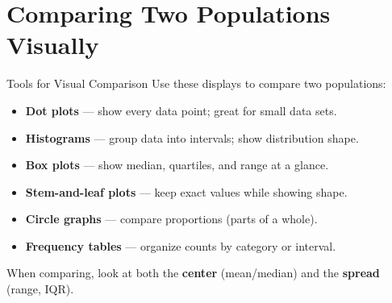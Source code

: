 \section{Comparing Two Populations Visually}

\begin{quickReview}{Tools for Visual Comparison}
Use these displays to compare two populations:

\begin{itemize}[leftmargin=*]
    \item \textbf{Dot plots} --- show every data point; great for small data sets.
    \item \textbf{Histograms} --- group data into intervals; show distribution shape.
    \item \textbf{Box plots} --- show median, quartiles, and range at a glance.
    \item \textbf{Stem-and-leaf plots} --- keep exact values while showing shape.
    \item \textbf{Circle graphs} --- compare proportions (parts of a whole).
    \item \textbf{Frequency tables} --- organize counts by category or interval.
\end{itemize}

When comparing, look at both the \textbf{center} (mean/median) and the \textbf{spread} (range, IQR).
\end{quickReview}

